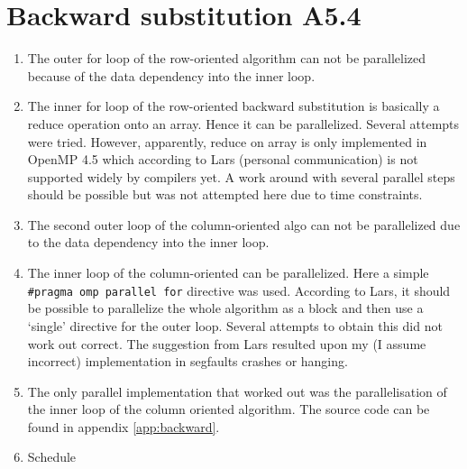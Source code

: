 \documentclass[a4paper,11pt,twoside]{article}
\begin{document}
\section{Backward substitution A5.4}
\begin{enumerate}[label={\alph*)}]
\item The outer for loop of the row-oriented algorithm can not be parallelized because of the data dependency into the inner loop. 
\item The inner for loop of the row-oriented backward substitution is basically a reduce operation onto an array. Hence it can be parallelized. Several attempts were tried. However, apparently, reduce on array is only implemented in OpenMP 4.5 which according to Lars (personal communication) is not supported widely by compilers yet. A work around with several parallel steps should be possible but was not attempted here due to time constraints. 
\item The second outer loop of the column-oriented algo can not be parallelized due to the data dependency into the inner loop. 
\item The inner loop of the column-oriented can be parallelized. Here a simple \verb+#pragma omp parallel for+ directive was used. According to Lars, it should be possible to parallelize the whole algorithm as a block and then use a `single' directive for the outer loop. Several attempts to obtain this did not work out correct. The suggestion from Lars resulted upon my (I assume incorrect) implementation in segfaults crashes or hanging. 
\item The only parallel implementation that worked out was the parallelisation of the inner loop of the column oriented algorithm. The source code can be found in appendix \ref{app:backward}.

\item Schedule
\end{enumerate}


\appendix
\end{document}
